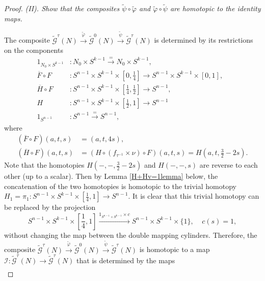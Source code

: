 \documentclass[a4]{amsart}
\theoremstyle{definition}
\begin{document}
\begin{sloppypar}
\begin{proof}
{\it (II). Show that the composites $ \widetilde{\psi}\circ  \widetilde{\varphi}$ and  $ \widetilde{\varphi}\circ  \widetilde{\psi}$ are homotopic to the identity maps.}

The composite $\widetilde{\mathcal{G}}^\tau(N)
\stackrel{\widetilde{\varphi}}{\longrightarrow} \widetilde{\mathcal{G}}^0(N) \stackrel{\widetilde{\psi}}{\longrightarrow} \widetilde{\mathcal{G}}^\tau (N)$ is determined by its restrictions on the components  
\[
\begin{split}
1_{N_0\times S^{k-1}}& :N_0\times S^{k-1}\stackrel{=}{\longrightarrow} N_0\times S^{k-1},   \\
\overline{F}\circ F& : S^{n-1}\times S^{k-1}\times [0, \frac{1}{4}]\longrightarrow  S^{n-1}\times S^{k-1}\times [0, 1], \ \ \   \\
\overline{H} \circ F   & :    S^{n-1}\times S^{k-1}\times [\frac{1}{4},\frac{1}{2}]\longrightarrow  S^{n-1},  \ \ \         \\ 
H& :S^{n-1}\times S^{k-1}\times [\frac{1}{2}, 1] \stackrel{}{\longrightarrow} S^{n-1} \\ 
1_{S^{n-1}}& : S^{n-1} \stackrel{=}{\longrightarrow} S^{n-1},
\end{split}
\]
where 
\[
\begin{split}
(\overline{F}\circ F)(a, t, s) &= (a, t, 4s), \\
(\overline{H} \circ F)(a,t,s) &=(H\circ (f_{\tau^{-1}}\times \nu)\circ F)(a,t,s)=H(a, t, \frac{3}{2}-2s).
\end{split}
\]
Note that the homotopies $H(-,-, \frac{3}{2}-2s)$ and $H(-,-,s)$ are reverse to each other (up to a scalar). 
Then by Lemma \ref{H+Hv=1lemma} below, the concatenation of the two homotopies is homotopic to the trivial homotopy 
$
H_1=\pi_1: S^{n-1}\times S^{k-1}\times [\frac{1}{4},1]\stackrel{}{\longrightarrow}  S^{n-1}$. 
It is clear that this trivial homotopy can be replaced by the projection
\[
S^{n-1}\times S^{k-1}\times [\frac{1}{4},1]\stackrel{1_{S^{n-1}\times S^{k-1}} \times c}{\longrightarrow}  S^{n-1}\times S^{k-1} \times \{1\}, \ \  \ \ \       c(s)=1, 
\] 
without changing the map between the double mapping cylinders. 
Therefore, the composite $\widetilde{\mathcal{G}}^\tau(N)\stackrel{\widetilde{\varphi}}{\longrightarrow} \widetilde{\mathcal{G}}^0(N) \stackrel{\widetilde{\psi}}{\longrightarrow} \widetilde{\mathcal{G}}^\tau (N)$ is homotopic to a map 
$
\mathcal{I}: \widetilde{\mathcal{G}}^\tau(N)\stackrel{}{\longrightarrow} \widetilde{\mathcal{G}}^\tau(N)
$
that is determined by the maps
\[
\begin{split}

\end{split}\]
\end{proof}
\end{sloppypar}
\end{document}

